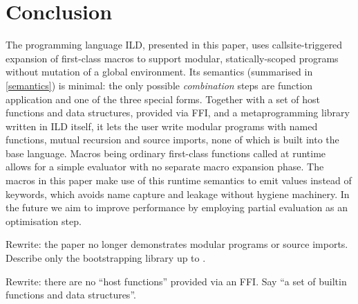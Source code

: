 \section{Conclusion}
The programming language ILD, presented in this paper, uses callsite-triggered
expansion of first-class macros to support modular, statically-scoped programs
without mutation of a global environment. Its semantics (summarised in
\cref{semantics}) is minimal: the only possible \emph{combination}
steps are function application and one of the three special forms. Together
with a set of host functions and data structures, provided via FFI, and a
metaprogramming library written in ILD itself, it lets the user write modular
programs with named functions, mutual recursion and source imports, none of
which is built into the base language. Macros being ordinary first-class
functions called at runtime allows for a simple evaluator with no separate
macro expansion phase. The macros in this paper make use of this runtime
semantics to emit values instead of keywords, which avoids name capture and
leakage without hygiene machinery. In the future we aim to improve performance
by employing partial evaluation as an optimisation step.
\begin{note}
  Rewrite: the paper no longer demonstrates modular programs or source imports.
  Describe only the bootstrapping library up to .
\end{note}
\begin{note}
  Rewrite: there are no ``host functions'' provided via an FFI. Say ``a set of
  builtin functions and data structures''.
\end{note}
